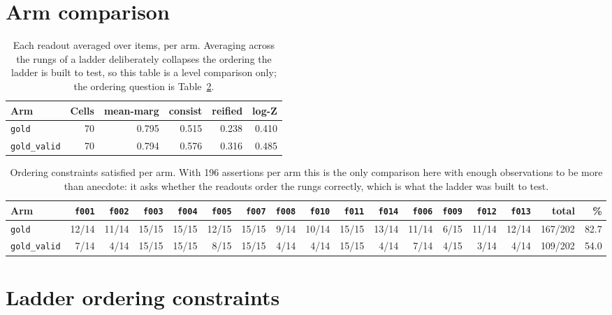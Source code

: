 \documentclass[11pt]{article}
\begin{document}
\section{Arm comparison}\label{sec:arms}

\begin{table}[htbp]
\centering
\small
\caption{Each readout averaged over items, per arm. Averaging across the rungs of a ladder deliberately collapses the ordering the ladder is built to test, so this table is a level comparison only; the ordering question is Table~\ref{tab:ladder-by-arm}.}
\label{tab:policy-lcs}
\begin{tabular}{lrrrrr}
\toprule
Arm & Cells & \textbf{mean-marg} & \textbf{consist} & \textbf{reified} & \textbf{log-Z} \\
\midrule
\texttt{gold} & 70 & 0.795 & 0.515 & 0.238 & 0.410 \\
\texttt{gold\_valid} & 70 & 0.794 & 0.576 & 0.316 & 0.485 \\
\bottomrule
\end{tabular}
\end{table}

\begin{table}[htbp]
\centering
\small
\caption{Ordering constraints satisfied per arm. With 196 assertions per arm this is the only comparison here with enough observations to be more than anecdote: it asks whether the readouts order the rungs correctly, which is what the ladder was built to test.}
\label{tab:ladder-by-arm}
\begin{tabular}{lrrrrrrrrrrrrrrrr}
\toprule
Arm & \texttt{f001} & \texttt{f002} & \texttt{f003} & \texttt{f004} & \texttt{f005} & \texttt{f007} & \texttt{f008} & \texttt{f010} & \texttt{f011} & \texttt{f014} & \texttt{f006} & \texttt{f009} & \texttt{f012} & \texttt{f013} & total & \% \\
\midrule
\texttt{gold} & 12/14 & 11/14 & 15/15 & 15/15 & 12/15 & 15/15 & 9/14 & 10/14 & 15/15 & 13/14 & 11/14 & 6/15 & 11/14 & 12/14 & 167/202 & 82.7 \\
\texttt{gold\_valid} & 7/14 & 4/14 & 15/15 & 15/15 & 8/15 & 15/15 & 4/14 & 4/14 & 15/15 & 4/14 & 7/14 & 4/15 & 3/14 & 4/14 & 109/202 & 54.0 \\
\bottomrule
\end{tabular}
\end{table}

\section{Ladder ordering constraints}\label{sec:ladder}
\end{document}
